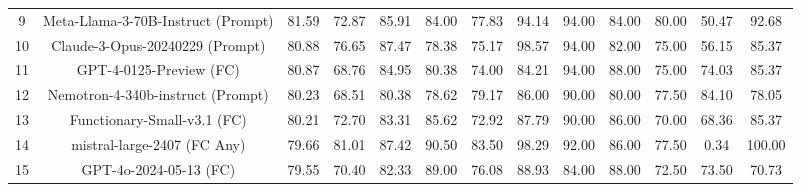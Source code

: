 \documentclass{article}
\begin{document}
\begin{table}[h]
{\begin{tabular}{ccccccccccccc}
9                      & Meta-Llama-3-70B-Instruct (Prompt)             & 81.59                         & 72.87  & 85.91    & 84.00    & 77.83                                                       & 94.14  & 94.00    & 84.00    & 80.00                                                       & 50.47                         & 92.68                       \\
10                     & Claude-3-Opus-20240229 (Prompt)                & 80.88                         & 76.65  & 87.47    & 78.38    & 75.17                                                       & 98.57  & 94.00    & 82.00    & 75.00                                                       & 56.15                         & 85.37                       \\
11                     & GPT-4-0125-Preview (FC)                        & 80.87                         & 68.76  & 84.95    & 80.38    & 74.00                                                       & 84.21  & 94.00    & 88.00    & 75.00                                                       & 74.03                         & 85.37                       \\
12                     & Nemotron-4-340b-instruct (Prompt)              & 80.23                         & 68.51  & 80.38    & 78.62    & 79.17                                                       & 86.00  & 90.00    & 80.00    & 77.50                                                       & 84.10                         & 78.05                       \\
13                     & Functionary-Small-v3.1 (FC)                    & 80.21                         & 72.70  & 83.31    & 85.62    & 72.92                                                       & 87.79  & 90.00    & 86.00    & 70.00                                                       & 68.36                         & 85.37                       \\
14                     & mistral-large-2407 (FC Any)                    & 79.66                         & 81.01  & 87.42    & 90.50    & 83.50                                                       & 98.29  & 92.00    & 86.00    & 77.50                                                       & 0.34                          & 100.00                      \\
15                     & GPT-4o-2024-05-13 (FC)                         & 79.55                         & 70.40  & 82.33    & 89.00    & 76.08                                                       & 88.93  & 84.00    & 88.00    & 72.50                                                       & 73.50                         & 70.73                       \\

\end{tabular}}
\end{table}
\end{document}
